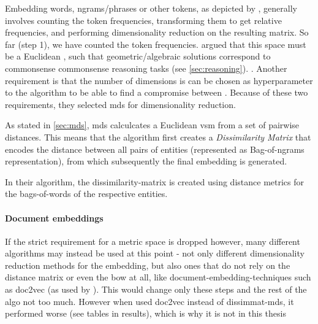 Embedding words, \glspl{ngram}/phrases or other tokens, as depicted by \cite{Turney2010,Lowe}, generally involves counting the token frequencies, transforming them to get relative frequencies, and performing dimensionality reduction on the resulting matrix.
So far (step 1), we have counted the token frequencies. 
\textcite{Derrac2015} argued that this space must be a Euclidean , such that geometric/algebraic solutions correspond to commonsense commonsense reasoning tasks (see \autoref{sec:reasoning}). . 
Another requirement is that the number of dimensions is can be chosen as hyperparameter to the algorithm to be able to find a compromise between . Because of these two requirements,  they selected \gls{mds} for dimensionality reduction.

As stated in \autoref{sec:mds}, \gls{mds} calculcates a Euclidean \gls{vsm} from a set of pairwise distances. This means that the algorithm first creates a \textit{Dissimilarity Matrix} that encodes the distance between all pairs of entities (represented as Bag-of-ngrams representation), from which subsequently the final embedding is generated.  


In their algorithm, the dissimilarity-matrix is created using distance metrics for the bags-of-words of the respective entities. 

\paragraph{Document embeddings}
If the strict requirement for a metric space is dropped however, many different algorithms may instead be used at this point - not only different dimensionality reduction methods for the embedding, but also ones that do not rely on the distance matrix or even the \gls{bow} at all, like document-embedding-techniques such as \gls{doc2vec} \cite{Le2014} (as \eg used by \cite{Alshaikh2020}). This would change only these steps and the rest of the algo not too much.
However when \cite{Alshaikh2020} used doc2vec instead of dissimmat-mds, it performed worse (see tables in results), which is why it is not in this thesis 


